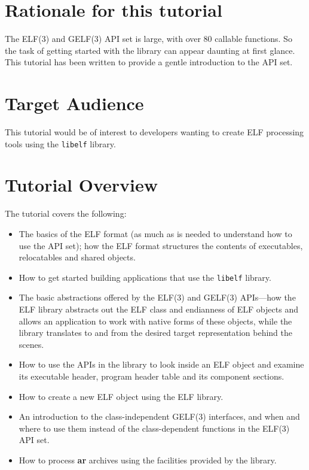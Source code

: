 \documentclass[a4paper,pdftex]{book}
\newcommand{\library}[1]{\texttt{#1}}
\newcommand{\tool}[1]{\textbf{#1}}
\begin{document}
\section*{Rationale for this tutorial}

The ELF(3) and GELF(3) API set is large, with over 80 callable
functions.  So the task of getting started with the library can appear
daunting at first glance.  This tutorial has been written to provide a
gentle introduction to the API set.

\section*{Target Audience}

This tutorial would be of interest to developers wanting to create ELF
processing tools using the \library{libelf} library.

\section{Tutorial Overview}

The tutorial covers the following:

\begin{itemize}
\item The basics of the ELF format (as much as is needed to understand
  how to use the API set); how the ELF format structures the contents
  of executables, relocatables and shared objects.
\item How to get started building applications that use the
  \library{libelf} library.
\item The basic abstractions offered by the ELF(3) and GELF(3)
  APIs---how the ELF library abstracts out the ELF class and
  endianness of ELF objects and allows an application to work with
  native forms of these objects, while the library translates to and
  from the desired target representation behind the scenes.
\item How to use the APIs in the library to look inside an ELF object
  and examine its executable header, program header table and its
  component sections.
\item How to create a new ELF object using the ELF library.
\item An introduction to the class-independent GELF(3) interfaces, and
  when and where to use them instead of the class-dependent functions
  in the ELF(3) API set.
\item How to process \tool{ar} archives using the facilities provided
  by the library.
\end{itemize}
\end{document}
